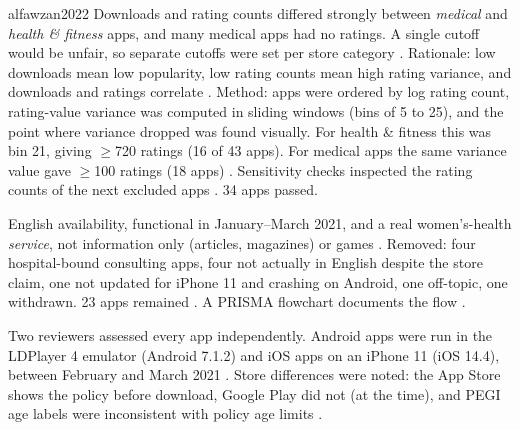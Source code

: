 \begin{papercard}{alfawzan2022}
 Downloads and rating counts differed strongly between \emph{medical} and \emph{health \& fitness} apps, and many medical apps had no ratings. A single cutoff would be unfair, so separate cutoffs were set per store category . Rationale: low downloads mean low popularity, low rating counts mean high rating variance, and downloads and ratings correlate . Method: apps were ordered by log rating count, rating-value variance was computed in sliding windows (bins of 5 to 25), and the point where variance dropped was found visually. For health \& fitness this was bin 21, giving $\geq$720 ratings (16 of 43 apps). For medical apps the same variance value gave $\geq$100 ratings (18 apps) . Sensitivity checks inspected the rating counts of the next excluded apps . 34 apps passed.

 English availability, functional in January--March 2021, and a real women's-health \emph{service}, not information only (articles, magazines) or games . Removed: four hospital-bound consulting apps, four not actually in English despite the store claim, one not updated for iPhone 11 and crashing on Android, one off-topic, one withdrawn. 23 apps remained . A PRISMA flowchart documents the flow .

 Two reviewers assessed every app independently. Android apps were run in the LDPlayer 4 emulator (Android 7.1.2) and iOS apps on an iPhone 11 (iOS 14.4), between February and March 2021 . Store differences were noted: the App Store shows the policy before download, Google Play did not (at the time), and PEGI age labels were inconsistent with policy age limits .


\end{papercard}
